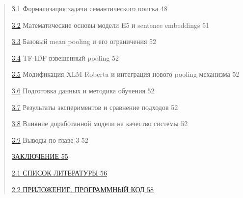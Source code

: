 \begin{quote}
\protect\hyperlink{ux444ux43eux440ux43cux430ux43bux438ux437ux430ux446ux438ux44f-ux437ux430ux434ux430ux447ux438-ux441ux435ux43cux430ux43dux442ux438ux447ux435ux441ux43aux43eux433ux43e-ux43fux43eux438ux441ux43aux430}{3.1}
Формализация задачи семантического поиска 48

\protect\hyperlink{ux43cux430ux442ux435ux43cux430ux442ux438ux447ux435ux441ux43aux438ux435-ux43eux441ux43dux43eux432ux44b-ux43cux43eux434ux435ux43bux438-e5-ux438-sentence-embeddings}{3.2}
Математические основы модели E5 и sentence embeddings 51

\protect\hyperlink{ux431ux430ux437ux43eux432ux44bux439-mean-pooling-ux438-ux435ux433ux43e-ux43eux433ux440ux430ux43dux438ux447ux435ux43dux438ux44f}{3.3}
Базовый mean pooling и его ограничения 52

\protect\hyperlink{tf-idf-ux432ux437ux432ux435ux448ux435ux43dux43dux44bux439-pooling}{3.4}
TF-IDF взвешенный pooling 52

\protect\hyperlink{ux43cux43eux434ux438ux444ux438ux43aux430ux446ux438ux44f-xlm-roberta-ux438-ux438ux43dux442ux435ux433ux440ux430ux446ux438ux44f-ux43dux43eux432ux43eux433ux43e-pooling-ux43cux435ux445ux430ux43dux438ux437ux43cux430}{3.5}
Модификация XLM-Roberta и интеграция нового pooling-механизма 52

\protect\hyperlink{ux43fux43eux434ux433ux43eux442ux43eux432ux43aux430-ux434ux430ux43dux43dux44bux445-ux438-ux43cux435ux442ux43eux434ux438ux43aux430-ux43eux431ux443ux447ux435ux43dux438ux44f}{3.6}
Подготовка данных и методика обучения 52

\protect\hyperlink{ux440ux435ux437ux443ux43bux44cux442ux430ux442ux44b-ux44dux43aux441ux43fux435ux440ux438ux43cux435ux43dux442ux43eux432-ux438-ux441ux440ux430ux432ux43dux435ux43dux438ux435-ux43fux43eux434ux445ux43eux434ux43eux432}{3.7}
Результаты экспериментов и сравнение подходов 52

\protect\hyperlink{_heading=h.7v161abhcagm}{3.8} Влияние доработанной
модели на качество системы 52

\protect\hyperlink{ux432ux44bux432ux43eux434ux44b-ux43fux43e-ux433ux43bux430ux432ux435}{3.9}
Выводы по главе 3 52

\protect\hyperlink{ux437ux430ux43aux43bux44eux447ux435ux43dux438ux435}{ЗАКЛЮЧЕНИЕ
55}

\protect\hyperlink{ux441ux43fux438ux441ux43eux43a-ux43bux438ux442ux435ux440ux430ux442ux443ux440ux44b}{2.1
СПИСОК ЛИТЕРАТУРЫ 56}

\protect\hyperlink{_heading=h.qoytwf794z6d}{2.2 ПРИЛОЖЕНИЕ. ПРОГРАММНЫЙ
КОД 58}
\end{quote}

